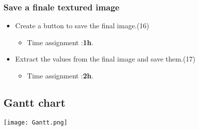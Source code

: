 \documentclass[12pt]{article}
\begin{document}
\subsubsection{\textbf{Save a finale textured image}}
\begin{itemize}
	\item Create a button to save the final image.(16)
	      \begin{itemize}
	      	\item Time assignment :\textbf{1h}.
	      \end{itemize}
        \item Extract the values from the final image and save them.(17)
	      \begin{itemize}
	      	\item Time assignment :\textbf{2h}.
	      \end{itemize}  
\end{itemize}
\medbreak
\subsection{Gantt chart}

  \texttt{[image: Gantt.png]}

\medbreak
\end{document}
